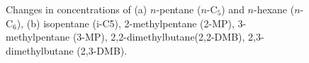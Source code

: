 \documentclass[mathematics,article,submit,pdftex,moreauthors]{Definitions/mdpi}
\begin{document}
\begin{figure}
\center
\begin{minipage}{0.45\linewidth}
\end{minipage}
\begin{minipage}{0.45\linewidth}
\end{minipage}
\caption{Changes in concentrations of (a) $n$-pentane ($n$-C$_5$) and $n$-hexane ($n$-C$_6$), (b) isopentane (i-C5), 2-methylpentane (2-MP), 3-methylpentane (3-MP), 2,2-dimethylbutane(2,2-DMB), 2,3-dimethylbutane (2,3-DMB).}\label{fig:res1}
\end{figure}  
\end{document}
